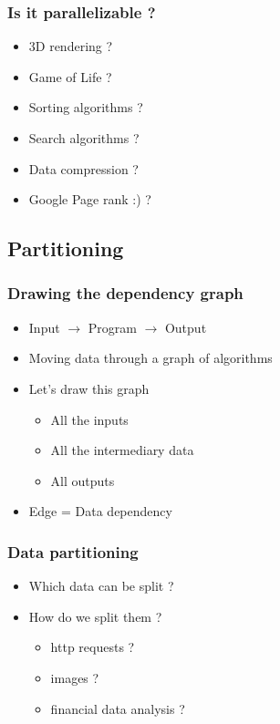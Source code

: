 \begin{frame}
  \frametitle{Is it parallelizable ?}

  \begin{itemize}
  \item 3D rendering ?
  \item Game of Life ?
  \item Sorting algorithms ?
  \item Search algorithms ?
  \item Data compression ?
  \item Google Page rank :) ?
  \end{itemize}
\end{frame}



\subsection{Partitioning}
\label{subsec:datadeps}

\begin{frame}
  \frametitle{Drawing the dependency graph}

  \begin{itemize}
  \item Input $\rightarrow$ Program $\rightarrow$ Output
  \item Moving data through a graph of algorithms
  \item Let's draw this graph
    \begin{itemize}
    \item All the inputs
    \item All the intermediary data
    \item All outputs
    \end{itemize}
  \item Edge = Data dependency
  \end{itemize}
\end{frame}

\begin{frame}
  \frametitle{Data partitioning}
  \begin{itemize}
  \item Which data can be split ?
  \item How do we split them ?
    \begin{itemize}
    \item http requests ?
    \item images ?
    \item financial data analysis ?
    \end{itemize}
  \end{itemize}
\end{frame}

